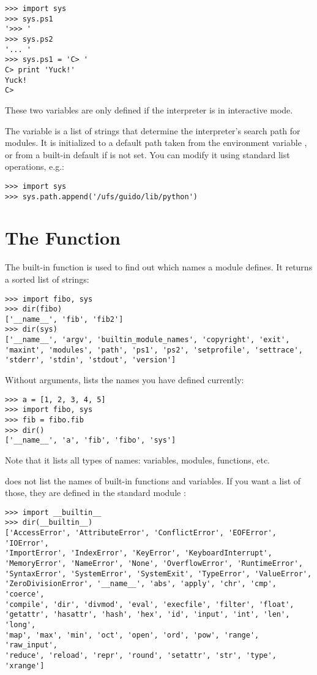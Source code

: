 \documentclass{manual}
\begin{document}
\begin{verbatim}
>>> import sys
>>> sys.ps1
'>>> '
>>> sys.ps2
'... '
>>> sys.ps1 = 'C> '
C> print 'Yuck!'
Yuck!
C> 
\end{verbatim}

These two variables are only defined if the interpreter is in
interactive mode.

The variable
is a list of strings that determine the interpreter's search path for
modules.
It is initialized to a default path taken from the environment variable
, or from a built-in default if 
is not set.  You can modify it using standard list operations, e.g.:

\begin{verbatim}
>>> import sys
>>> sys.path.append('/ufs/guido/lib/python')
\end{verbatim}

\section{The  Function}
\label{dir}

The built-in function  is used to find out which names
a module defines.  It returns a sorted list of strings:

\begin{verbatim}
>>> import fibo, sys
>>> dir(fibo)
['__name__', 'fib', 'fib2']
>>> dir(sys)
['__name__', 'argv', 'builtin_module_names', 'copyright', 'exit',
'maxint', 'modules', 'path', 'ps1', 'ps2', 'setprofile', 'settrace',
'stderr', 'stdin', 'stdout', 'version']
\end{verbatim}

Without arguments,  lists the names you have defined
currently:

\begin{verbatim}
>>> a = [1, 2, 3, 4, 5]
>>> import fibo, sys
>>> fib = fibo.fib
>>> dir()
['__name__', 'a', 'fib', 'fibo', 'sys']
\end{verbatim}

Note that it lists all types of names: variables, modules, functions, etc.

 does not list the names of built-in functions and
variables.  If you want a list of those, they are defined in the
standard module :

\begin{verbatim}
>>> import __builtin__
>>> dir(__builtin__)
['AccessError', 'AttributeError', 'ConflictError', 'EOFError', 'IOError',
'ImportError', 'IndexError', 'KeyError', 'KeyboardInterrupt',
'MemoryError', 'NameError', 'None', 'OverflowError', 'RuntimeError',
'SyntaxError', 'SystemError', 'SystemExit', 'TypeError', 'ValueError',
'ZeroDivisionError', '__name__', 'abs', 'apply', 'chr', 'cmp', 'coerce',
'compile', 'dir', 'divmod', 'eval', 'execfile', 'filter', 'float',
'getattr', 'hasattr', 'hash', 'hex', 'id', 'input', 'int', 'len', 'long',
'map', 'max', 'min', 'oct', 'open', 'ord', 'pow', 'range', 'raw_input',
'reduce', 'reload', 'repr', 'round', 'setattr', 'str', 'type', 'xrange']
\end{verbatim}
\end{document}
